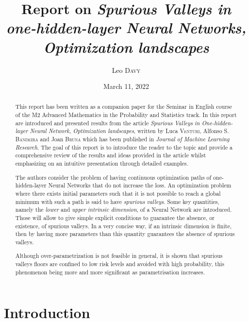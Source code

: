 \documentclass[11pt]{article} %
\title{Report on \emph{Spurious Valleys in one-hidden-layer Neural Networks, Optimization landscapes}}
\author{Leo \textsc{Davy}}
\date{March 11, 2022} %
\begin{document}
\maketitle
\begin{abstract}
	This report has been written as a companion paper for the Seminar in English course of the M2 Advanced Mathematics in the Probability and Statistics track. In this report are introduced and presented results from the article \emph{Spurious Valleys in One-hidden-layer Neural Network, Optimization landscapes}, written by Luca \textsc{Venturi}, Alfonso S. \textsc{Bandeira} and Joan \textsc{Bruna} which has been published in \emph{Journal of Machine Learning Research}.
	The goal of this report is to introduce the reader to the topic and provide a comprehensive review of the results and ideas provided in the article whilst emphasizing on an intuitive presentation through detailed examples. 
	\par
The authors consider the problem of having continuous optimization paths of one-hidden-layer Neural Networks that do not increase the loss. An optimization problem where there exists initial parameters such that it is not possible to reach a global minimum with such a path is said to have \emph{spurious valleys}. Some key quantities, namely the \emph{lower} and \emph{upper intrinsic dimension}, of a Neural Network are introduced. Those will allow to give simple explicit conditions to guarantee the absence, or existence, of spurious valleys. In a very concise way, if an intrinsic dimension is finite, then by having more parameters than this quantity guarantees the absence of spurious valleys.
	\par 
	Although over-parametrization is not feasible in general, it is shown that spurious valleys floors are confined to low risk levels and avoided with high probability, this phenomenon being more and more significant as parametrisation increases. 
\end{abstract}
\tableofcontents
\section{Introduction}
\end{document}
